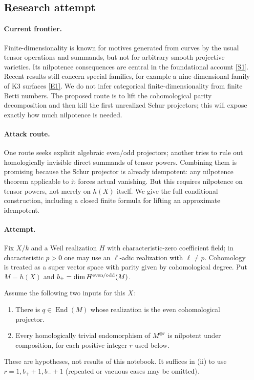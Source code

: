 \documentclass[11pt,a4paper]{article}
\newcommand{\sref}[2]{\hyperlink{source:#1:#2}{[S#2]}}
\newcommand{\eref}[2]{\hyperlink{extra:#1:#2}{[E#2]}}
\numberwithin{equation}{section}
\begin{document}
\subsection{Research attempt}

\paragraph{Current frontier.}
Finite-dimensionality is known for motives generated from curves by the usual tensor operations and summands, but not for arbitrary smooth projective varieties. Its nilpotence consequences are central in the foundational account \sref{statement}{1}. Recent results still concern special families, for example a nine-dimensional family of K3 surfaces \eref{statement}{1}. We do not infer categorical finite-dimensionality from finite Betti numbers. The proposed route is to lift the cohomological parity decomposition and then kill the first unrealized Schur projectors; this will expose exactly how much nilpotence is needed.

\paragraph{Attack route.}
One route seeks explicit algebraic even/odd projectors; another tries to rule out homologically invisible direct summands of tensor powers. Combining them is promising because the Schur projector is already idempotent: any nilpotence theorem applicable to it forces actual vanishing. But this requires nilpotence on tensor powers, not merely on $h(X)$ itself. We give the full conditional construction, including a closed finite formula for lifting an approximate idempotent.

\paragraph{Attempt.}
Fix $X/k$ and a Weil realization $H$ with characteristic-zero coefficient field; in characteristic $p>0$ one may use an $\ell$-adic realization with $\ell\ne p$. Cohomology is treated as a super vector space with parity given by cohomological degree. Put $M=h(X)$ and $b_\pm=\dim H^{\rm even/odd}(M)$.

Assume the following two inputs for this $X$:
\begin{enumerate}[label=(\roman*),leftmargin=2.5em]
\item There is $q\in\operatorname{End}(M)$ whose realization is the even cohomological projector.
\item Every homologically trivial endomorphism of $M^{\otimes r}$ is nilpotent under composition, for each positive integer $r$ used below.
\end{enumerate}
These are hypotheses, not results of this notebook. It suffices in (ii) to use $r=1,b_++1,b_-+1$ (repeated or vacuous cases may be omitted).
\end{document}
